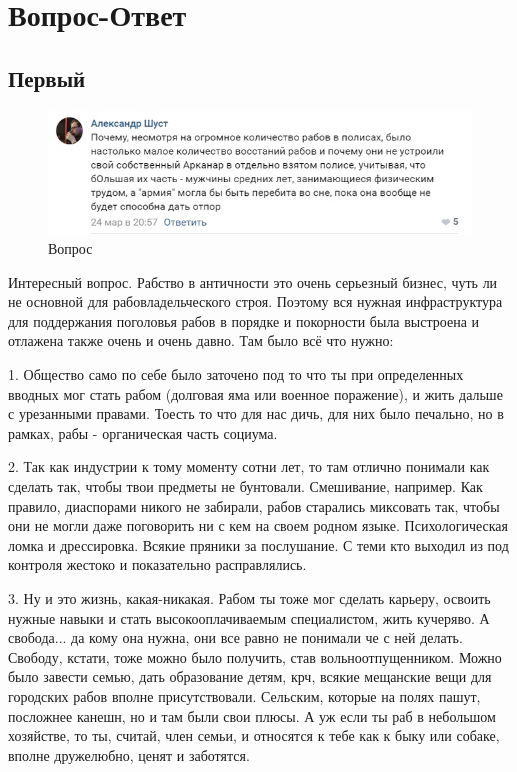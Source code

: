 \chapter{Вопрос-Ответ}

\section{Первый}

\begin{figure}[h!tb] 
	\centering\includegraphics[scale=0.3]{VoprosOtvet/1585473124128666065.png}
	\caption{Вопрос}%
\end{figure}	

Интересный вопрос. Рабство в античности это очень серьезный бизнес, чуть ли не основной для рабовладельческого строя. Поэтому вся нужная инфраструктура для поддержания поголовья рабов в порядке и покорности была выстроена и отлажена также очень и очень давно. Там было всё что нужно:


1. Общество само по себе было заточено под то что ты при определенных вводных мог стать рабом (долговая яма или военное поражение), и жить дальше с урезанными правами. Тоесть то что для нас дичь, для них было печально, но в рамках, рабы - органическая часть социума.


2. Так как индустрии к тому моменту сотни лет, то там отлично понимали как сделать так, чтобы твои предметы не бунтовали. Смешивание, например. Как правило, диаспорами никого не забирали, рабов старались миксовать так, чтобы они не могли даже поговорить ни с кем на своем родном языке. Психологическая ломка и дрессировка. Всякие пряники за послушание. С теми кто выходил из под контроля жестоко и показательно расправлялись.


3. Ну и это жизнь, какая-никакая. Рабом ты тоже мог сделать карьеру, освоить нужные навыки и стать высокооплачиваемым специалистом, жить кучеряво. А свобода... да кому она нужна, они все равно не понимали че с ней делать. Свободу, кстати, тоже можно было получить, став вольноотпущенником. Можно было завести семью, дать образование детям, крч, всякие мещанские вещи для городских рабов вполне присутствовали. Сельским, которые на полях пашут, посложнее канешн, но и там были свои плюсы. А уж если ты раб в небольшом хозяйстве, то ты, считай, член семьи, и относятся к тебе как к быку или собаке, вполне дружелюбно, ценят и заботятся.


